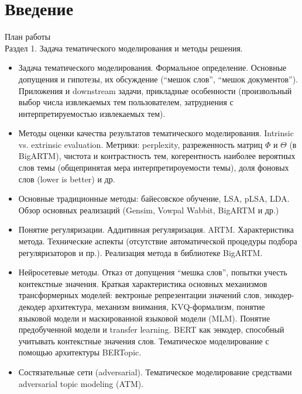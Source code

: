 \chapter*{Введение}

План работы\\

Раздел 1. Задача тематического моделирования и методы решения.
\begin{itemize}
  \item Задача тематического моделирования. Формальное определение. Основные допущения и гипотезы, их обсуждение (``мешок слов'', ``мешок документов''). Приложения и downstream задачи, прикладные особенности (произвольный выбор числа извлекаемых тем пользователем, затруднения с интерпретируемостью извлекаемых тем).
  \item Методы оценки качества результатов тематического моделирования. Intrinsic vs. extrinsic evaluation. Метрики: perplexity, разреженность матриц $\Phi$ и $\Theta$ (в BigARTM), чистота и контрастность тем, когерентность наиболее вероятных слов темы (общепринятая мера интерпретироуемости темы), доля фоновых слов (lower is better)  и др.
  \item Основные традиционные методы: байесовское обучение, LSA, pLSA, LDA. Обзор основных реализаций (Gensim, Vowpal Wabbit, BigARTM и др.)
  \item Понятие регуляризации. Аддитивная регуляризация. ARTM. Характеристика метода. Технические аспекты (отсутствие автоматической процедуры подбора регуляризаторов и пр.). Реализация метода в библиотеке BigARTM.
  \item Нейросетевые методы. Отказ от допущения ``мешка слов'', попытки учесть контекстные значения. Краткая характеристика основных механизмов трансформерных моделей: вектроные репрезентации значений слов, энкодер-декодер архитектура, механизм внимания, KVQ-формализм, понятие языковой модели и маскированной языковой модели (MLM). Понятие предобученной модели и transfer learning. BERT как энкодер, способный учитывать контекстные значения слов. Тематическое моделирование с помощью архитектуры BERTopic.
  \item Состязательные сети (adversarial). Тематическое моделирование средствами adversarial topic modeling (ATM).
\end{itemize}

\bigskip

